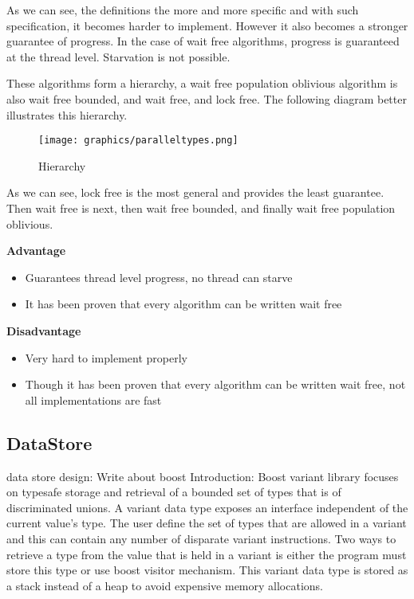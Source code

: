 \documentclass[letterpaper, 12pt]{article}
\begin{document}
As we can see, the definitions the more and more specific and with such specification, it becomes 
harder to implement. However it also becomes a stronger guarantee of progress. In the case of 
wait free algorithms, progress is guaranteed at the thread level. Starvation is not possible.

These algorithms form a hierarchy, a wait free population oblivious algorithm is also wait 
free bounded, and wait free, and lock free. The following diagram better illustrates 
this hierarchy.

\begin{figure}
    \centering
	\texttt{[image: graphics/paralleltypes.png]}
	\caption{Hierarchy}
	\citep{concurrencyfreaks}
\end{figure}


As we can see, lock free is the most general and provides the least guarantee. Then 
wait free is next, then wait free bounded, and finally wait free population oblivious.


{\bfseries Advantage}
\par\vspace{\baselineskip}
\begin{itemize}

	\item Guarantees thread level progress, no thread can starve
	\item It has been proven that every algorithm can be written wait free
\end{itemize}


{\bfseries Disadvantage}
\par\vspace{\baselineskip}
\begin{itemize}

	\item Very hard to implement properly
	\item Though it has been proven that every algorithm can be written wait free, not all implementations are fast
\end{itemize}

\newpage


\subsection{DataStore}
data store design:
Write about boost
Introduction:
Boost variant library focuses on typesafe storage and retrieval of a bounded set of types that is
of discriminated unions. A variant data type exposes an interface independent of the current value's type.
The user define the set of types that are allowed in a variant and this can contain any number of disparate
variant instructions. Two ways to retrieve a type from the value that is held in a variant is either the program
must store this type or use boost visitor mechanism. This variant data type is stored as a stack instead of a heap
to avoid expensive memory allocations.
\par\vspace{\baselineskip}
\end{document}
